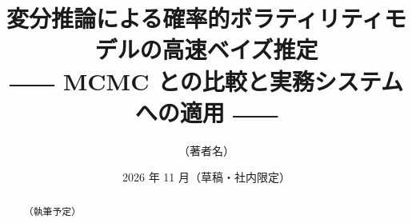 \documentclass[a4paper,11pt]{ltjsarticle}
\title{変分推論による確率的ボラティリティモデルの高速ベイズ推定\\[0.3em]
  \large ―― MCMC との比較と実務システムへの適用 ――}
\author{（著者名）}
\date{2026 年 11 月（草稿・社内限定）}
\begin{document}
\maketitle

\begin{abstract}
（執筆予定）
\end{abstract}










\printbibliography[title={参考文献}]

\appendix

\end{document}
